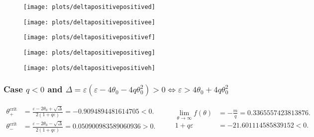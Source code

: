 \documentclass[
    8pt,
    aspectratio=1610,
    c,
    intlimits,
    leqno,
    professionalfonts,
]{beamer}
\begin{document}
\begin{frame}
	\begin{figure}[ht!]
		\centering
		\texttt{[image: plots/deltapositivepositived]}
	\end{figure}
\end{frame}

\begin{frame}
	\begin{figure}[ht!]
		\centering
		\texttt{[image: plots/deltapositivepositivee]}
	\end{figure}
\end{frame}

\begin{frame}
	\begin{figure}[ht!]
		\centering
		\texttt{[image: plots/deltapositivepositivef]}
	\end{figure}
\end{frame}

\begin{frame}
	\begin{figure}[ht!]
		\centering
		\texttt{[image: plots/deltapositivepositiveg]}
	\end{figure}
\end{frame}

\begin{frame}
	\begin{figure}[ht!]
		\centering
		\texttt{[image: plots/deltapositivepositiveh]}
	\end{figure}
\end{frame}

\begin{frame}
	\frametitle{Case $q<0$ and
		\begin{math}
			\Delta=
			\varepsilon\left(\varepsilon-4\theta_{0}-4q\theta^{2}_{0}\right)>
			0\iff\varepsilon>4\theta_{0}+4q\theta^{2}_{0}
		\end{math}
	}

	\begin{equation*}
		\begin{aligned}
			\theta^{\text{crit}}_{+} & =
			\frac{
				\varepsilon-2\theta_{0}+\sqrt{\Delta}
			}{
				2\left(1+q\varepsilon\right)
			}=
			-0.9094894481614705<
			0.                           \\
			\theta^{\text{crit}}_{-} & =
			\frac{
				\varepsilon-2\theta_{0}-\sqrt{\Delta}
			}{
				2\left(1+q\varepsilon\right)
			}=
			0.050900983589060936
			>0.
		\end{aligned}\qquad
		\begin{aligned}
			\lim_{\theta\to\infty}f\left(\theta\right) & =
			-\frac{m}{q}=
			0.3365557423813876.                            \\
			1+q\varepsilon                             & =
			-21.601114585839152<0.
		\end{aligned}
	\end{equation*}
\end{frame}
\end{document}

